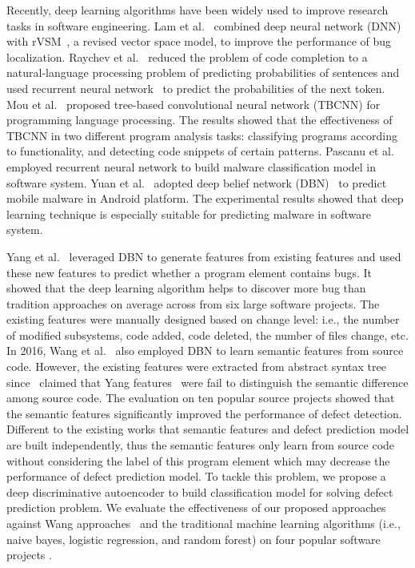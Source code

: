 Recently, deep learning algorithms have been widely used to improve research tasks in software engineering. Lam et al.~\cite{lam2015combining} combined deep neural network (DNN)~\cite{hecht1988theory} with rVSM~\cite{zhou2012should}, a revised vector space model, to improve the performance of bug localization. Raychev et al.~\cite{raychev2014code} reduced the problem of code completion to a natural-language processing problem of predicting probabilities of sentences and used recurrent neural network~\cite{mikolov2010recurrent} to predict the probabilities of the next token. Mou et al.~\cite{mou2014tbcnn} proposed tree-based convolutional neural network (TBCNN) for programming language processing. The results showed that the effectiveness of TBCNN  in two different program analysis tasks: classifying programs according to functionality, and detecting code snippets of certain patterns. Pascanu et al.~\cite{pascanu2015malware} employed recurrent neural network to build malware classification model in software system. Yuan et al.~\cite{yuan2014droid} adopted deep belief network (DBN)~\cite{hinton2009deep} to predict mobile malware in Android platform. The experimental results showed that deep learning technique is especially suitable for predicting malware in software system. 

Yang et al.~\cite{yang2015deep} leveraged DBN to generate features from existing features and used these new features to predict whether a program element contains bugs. It showed that the deep learning algorithm helps to discover more bug than tradition approaches on average across from six large software projects. The existing features were manually designed based on change level: i.e., the number of modified subsystems, code added, code deleted, the number of files change, etc. In 2016, Wang et al.~\cite{wang2016automatically} also employed DBN to learn semantic features from source code. However, the existing features were extracted from abstract syntax tree since~\cite{wang2012compressed} claimed that Yang features~\cite{yang2015deep} were fail to distinguish the semantic difference among source code. The evaluation on ten popular source projects showed that the semantic features significantly improved the performance of defect detection. Different to the existing works that semantic features and defect prediction model are built independently, thus the semantic features only learn from source code without considering the label of this program element which may decrease the performance of defect prediction model. To tackle this problem, we propose a deep  discriminative autoencoder to build classification model for solving defect prediction problem.  We evaluate the effectiveness of our proposed approaches against Wang approaches~\cite{wang2012compressed} and the traditional machine learning algorithms (i.e., naive bayes, logistic regression, and random forest) on four popular software projects .

